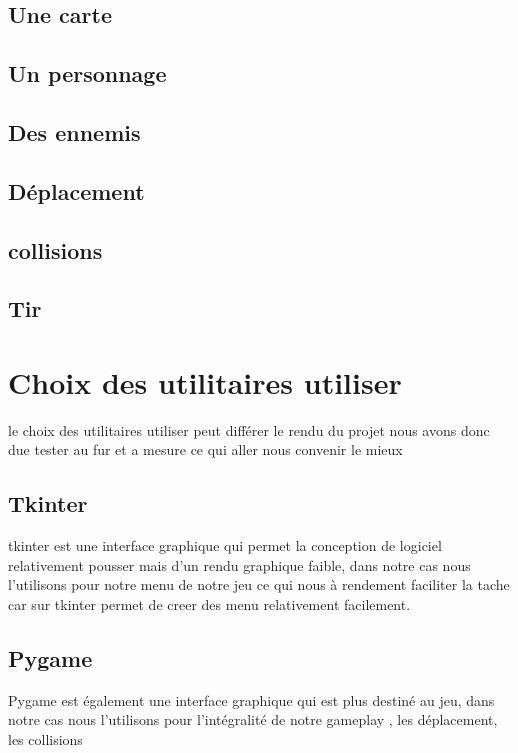 \documentclass[a4paper, 11pt]{article}
\begin{document}
 \subsection{Une carte}
\subsection{Un personnage}
\subsection{Des ennemis}
\subsection{Déplacement}
\subsection{collisions}
\subsection{Tir}

\section{Choix des utilitaires utiliser}

le choix des utilitaires utiliser peut différer le rendu du projet nous avons donc due tester au fur et a mesure ce qui aller nous convenir le mieux

\subsection{Tkinter}
tkinter est une interface graphique qui permet la conception de logiciel relativement pousser mais d'un rendu graphique faible, dans notre cas nous l'utilisons pour notre menu de notre jeu ce qui nous à rendement faciliter la tache car sur tkinter permet de creer des menu relativement facilement.
\subsection{Pygame}
Pygame est également une interface graphique qui est plus destiné au jeu,
dans notre cas nous l'utilisons pour l'intégralité de notre gameplay , les déplacement, les collisions 
\end{document}
